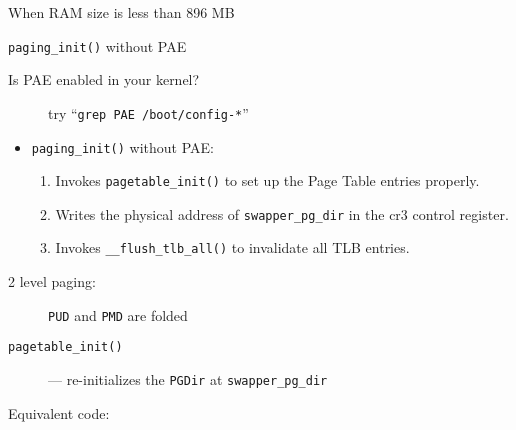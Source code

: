 \begin{frame}{When RAM size is less than 896 MB}%
  \begin{block}{\texttt{paging\_init()} without PAE}
    \begin{center}
    \end{center}
  \end{block}
\end{frame}

\begin{description}
\item[Is PAE enabled in your kernel?] try ``\texttt{grep PAE /boot/config-*}''
\end{description}

\begin{itemize}
\item \noindent\texttt{paging\_init()} without PAE:
  \begin{enumerate}
  \item Invokes \texttt{pagetable\_init()} to set up the Page Table entries properly.
  \item Writes the physical address of \texttt{swapper\_pg\_dir} in the cr3 control register.
  \item Invokes \texttt{\_\_flush\_tlb\_all()} to invalidate all TLB entries.
  \end{enumerate}
\end{itemize}

\begin{frame}
  \begin{description}
  \item[2 level paging:] \texttt{PUD} and \texttt{PMD} are folded
  \end{description}
  \begin{center}
  \end{center}
  \begin{description}
  \item[\texttt{pagetable\_init()}] --- re-initializes the \texttt{PGDir} at
    \texttt{swapper\_pg\_dir}
  \item[Equivalent code:] 
  \end{description}
  \begin{center}
  \end{center}
\end{frame}

